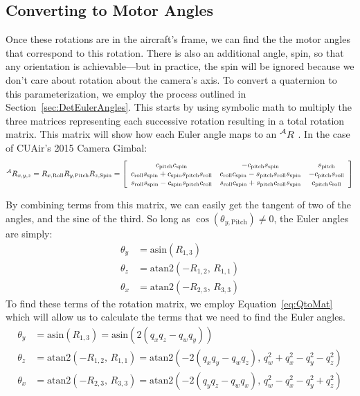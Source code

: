 \documentclass[letterpaper,10pt]{article}
\newcommand\leftidx[3]{%
  {\vphantom{#2}}#1#2#3%
}
\begin{document}
\subsection{Converting to Motor Angles}
\label{sec:MotorAngles}
Once these rotations are in the aircraft's frame, we can find the the motor angles that correspond to this rotation. There is also an additional angle, spin, so that any orientation is achievable---but in practice, the spin will be ignored because we don't care about rotation about the camera's axis. To convert a quaternion to this parameterization, we employ the process outlined in Section~\ref{sec:DetEulerAngles}. This starts by using symbolic math to multiply the three matrices representing each successive rotation resulting in a total rotation matrix. This matrix will show how each Euler angle maps to an $\leftidx{^\mathcal{A}}{R}$. In the case of CUAir's 2015 Camera Gimbal:
\begin{equation*}
\leftidx{^\mathcal{A}}{R}{_{x,y,z}} = R_{x,\text{Roll}} R_{y,\text{Pitch}} R_{z,\text{Spin}} = \left[\begin{array}{c c c} c_\text{pitch} c_\text{spin} & -c_\text{pitch} s_\text{spin} & s_\text{pitch} \\ c_\text{roll} s_\text{spin} + c_\text{spin} s_\text{pitch} s_\text{roll} & c_\text{roll} c_\text{spin} - s_\text{pitch} s_\text{roll} s_\text{spin} & -c_\text{pitch} s_\text{roll} \\ s_\text{roll} s_\text{spin} - c_\text{spin} s_\text{pitch} c_\text{roll} & s_\text{roll} c_\text{spin} + s_\text{pitch} c_\text{roll} s_\text{spin} & c_\text{pitch} c_\text{roll} \end{array} \right]
\end{equation*}

By combining terms from this matrix, we can easily get the tangent of two of the angles, and the sine of the third. So long as $\cos\!\left(\theta_{y,\text{Pitch}}\right) \neq 0$, the Euler angles are simply:
\begin{align*}
\theta_y &= \mathrm{asin}\!\left(R_{1,3}\right) \\
\theta_z &= \mathrm{atan2}\!\left(-R_{1,2}, \, R_{1,1}\right) \\
\theta_x &= \mathrm{atan2}\!\left(-R_{2,3}, \, R_{3,3}\right)
\end{align*}
To find these terms of the rotation matrix, we employ Equation~\ref{eq:QtoMat} which will allow us to calculate the terms that we need to find the Euler angles.
\begin{align}
\theta_y &= \mathrm{asin}\!\left(R_{1,3}\right) = \mathrm{asin}\!\left(2\left(q_x q_z - q_w q_y\right)\right) \\
\theta_z &= \mathrm{atan2}\!\left(-R_{1,2}, \, R_{1,1}\right) = \mathrm{atan2}\!\left(-2\left(q_x q_y - q_w q_z\right), \, q_w^2 +q_x^2 - q_y^2 - q_z^2\right) \\
\theta_x &= \mathrm{atan2}\!\left(-R_{2,3}, \, R_{3,3}\right) = \mathrm{atan2}\!\left(-2\left(q_y q_z - q_w q_x\right), \, q_w^2 - q_x^2 - q_y^2 + q_z^2\right)
\end{align}
\end{document}
